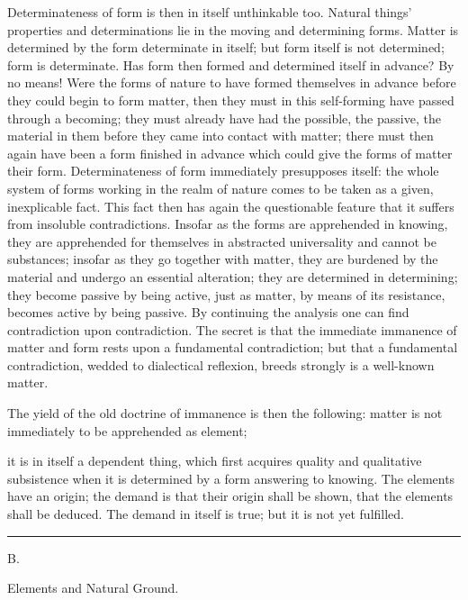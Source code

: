 \documentclass[12pt,a4paper]{book}
\newcommand{\afdeling}[2]{%
  \par\vspace{1.3\baselineskip}%
  {\centering #1\par\vspace{0.2\baselineskip}\normalsize #2\par}%
  \addcontentsline{toc}{section}{#1 #2}%
  \vspace{0.8\baselineskip}\par\nointerlineskip}
\newcommand{\streg}{\begin{center}\rule{2cm}{0.4pt}\end{center}}
\begin{document}
Determinateness of form is then in itself unthinkable too. Natural things' properties and determinations lie in
the moving and determining forms. Matter is determined by the form determinate in itself; but form itself is not
determined; form is determinate. Has form then formed and determined itself in advance? By no means! Were the
forms of nature to have formed themselves in advance before they could begin to form matter, then they must in
this self-forming have passed through a becoming; they must already have had the possible, the passive, the
material in them before they came into contact with matter; there must then again have been a form finished in
advance which could give the forms of matter their form. Determinateness of form immediately presupposes itself:
the whole system of forms working in the realm of nature comes to be taken as a given, inexplicable fact. This fact
then has again the questionable feature that it suffers from insoluble contradictions. Insofar as the forms are
apprehended in knowing, they are apprehended for themselves in abstracted universality and cannot be substances;
insofar as they go together with matter, they are burdened by the material and undergo an essential alteration;
they are determined in determining; they become passive by being active, just as matter, by means of its
resistance, becomes active by being passive. By continuing the analysis one can find contradiction upon
contradiction. The secret is that the immediate immanence of matter and form rests upon a fundamental
contradiction; but that a fundamental contradiction, wedded to dialectical reflexion, breeds strongly is a
well-known matter.

The yield of the old doctrine of immanence is then the following: matter is not immediately to be apprehended as
element;

it is in itself a dependent thing, which first acquires quality and qualitative subsistence when it is determined
by a form answering to knowing. The elements have an origin; the demand is that their origin shall be shown, that
the elements shall be deduced. The demand in itself is true; but it is not yet fulfilled.

\streg

\afdeling{B.}{Elements and Natural Ground.}
\end{document}
